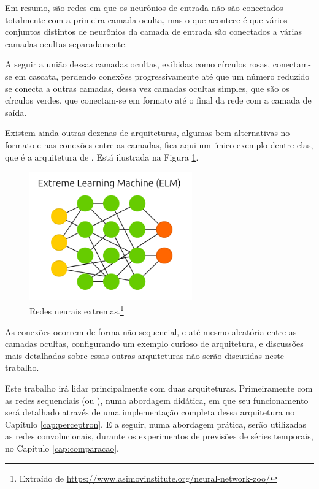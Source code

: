 Em resumo, são redes em que os neurônios de entrada não são conectados totalmente com a primeira camada oculta, mas o que acontece é que vários conjuntos distintos de neurônios da camada de entrada são conectados a várias camadas ocultas separadamente.

A seguir a união dessas camadas ocultas, exibidas como círculos rosas, conectam-se em cascata, perdendo conexões progressivamente até que um número reduzido se conecta a outras camadas, dessa vez camadas ocultas simples, que são os círculos verdes, que conectam-se em formato  até o final da rede com a camada de saída. 

Existem ainda outras dezenas de arquiteturas, algumas bem alternativas no formato e nas conexões entre as camadas, fica aqui um único exemplo dentre elas, que é a arquitetura de . Está ilustrada na Figura \ref{fig:estrutura_e}.

\begin{figure}[htb]
\centering
\includegraphics[width=7cm]{figuras/estrutura_e}
\caption{Redes neurais extremas.\footnote{Extraído de \url{https://www.asimovinstitute.org/neural-network-zoo/}}}
\label{fig:estrutura_e}
\end{figure}

As conexões ocorrem de forma não-sequencial, e até mesmo aleatória entre as camadas ocultas, configurando um exemplo curioso de arquitetura, e discussões mais detalhadas sobre essas outras arquiteturas não serão discutidas neste trabalho.

Este trabalho irá lidar principalmente com duas arquiteturas. Primeiramente com as redes sequenciais (ou ), numa abordagem didática, em que seu funcionamento será detalhado através de uma implementação completa dessa arquitetura no Capítulo \ref{cap:perceptron}. E a seguir, numa abordagem prática, serão utilizadas as redes convolucionais, durante os experimentos de previsões de séries temporais, no Capítulo \ref{cap:comparacao}.